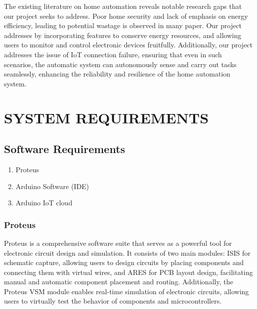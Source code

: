 \documentclass[12pt,a4paper]{report}
\begin{document}
	\begin{justify}
		The existing literature on home automation reveals notable research gaps that our project seeks to address. Poor home security and lack of emphasis on energy efficiency,   leading to potential wastage is observed in many paper. Our project addresses  by incorporating features to conserve energy resources, and  allowing users to monitor and control electronic devices fruitfully. Additionally, our project addresses the issue of IoT connection failure, ensuring that even in such scenarios, the automatic system can autonomously sense and carry out tasks seamlessly, enhancing the reliability and resilience of the home automation system.
		
		
	\end{justify}
	
	\chapter{SYSTEM REQUIREMENTS}
	
	\section{Software Requirements}
	
	\begin{enumerate}
		
		\item  Proteus	
		\item  Arduino Software (IDE)
		\item Arduino IoT cloud
	\end{enumerate}
	\vspace{2 px}
	
	\subsection{Proteus}
	
	\begin{justify}
		Proteus is a comprehensive software suite  that serves as a powerful tool for electronic circuit design and simulation. It consists of two main modules: ISIS for schematic capture, allowing users to design circuits by placing components and connecting them with virtual wires, and ARES for PCB layout design, facilitating manual and automatic component placement and routing. Additionally, the Proteus VSM module enables real-time simulation of electronic circuits, allowing users to virtually test the behavior of components and microcontrollers.
	\end{justify}
	
\end{document}
